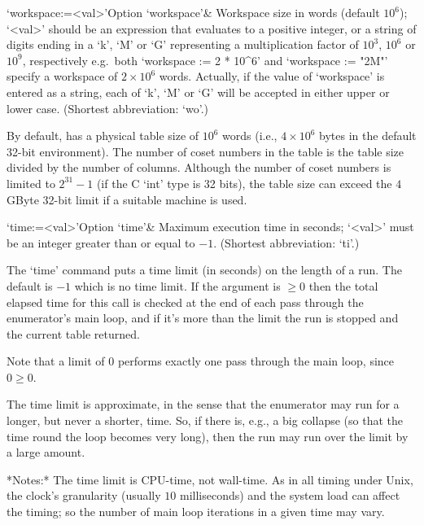 \beginitems

\>`workspace:=<val>'{Option `workspace'}&
Workspace size in words (default $10^6$);
`<val>' should be an expression that evaluates to a positive  integer,
or a string of digits ending in a  `k',  `M'  or  `G'  representing  a
multiplication  factor  of  $10^3$,  $10^6$  or  $10^9$,  respectively
e.g.~both `workspace := 2 * 10^6' and `workspace :=  "2M"'  specify  a
workspace  of  $2\times10^6$  words.  Actually,  if   the   value   of
`workspace' is entered as a string, each of `k', `M' or  `G'  will  be
accepted in either upper or lower case. (Shortest abbreviation: `wo'.)

By default, {\ACE} has a physical table size of $10^6$ words (i.e., $4
\times 10^6$ bytes in the  default 32-bit environment).  The number of
coset numbers in the table is  the table size divided by the number of
columns.   Although  the  number   of  coset  numbers  is  limited  to
$2^{31}-1$ (if the C `int' type is 32 bits), the table size can exceed
the $4$GByte 32-bit limit if a suitable machine is used.

\>`time:=<val>'{Option `time'}&
Maximum execution time in seconds; `<val>' must be an integer  greater
than or equal to $-1$. (Shortest abbreviation: `ti'.)

The `time' command  puts a time limit (in seconds) on  the length of a
run. The default is $-1$  which is no  time limit. If the  argument is
$\ge0$ then the total elapsed time for this call is checked at the end
of each pass through the enumerator's main loop, and if it's more than
the limit the run is stopped and the current table returned.

Note that a limit of $0$ performs exactly one pass  through  the  main
loop, since $0 \ge 0$.

%
%
%

The time  limit is approximate, in  the sense that  the enumerator may
run for a longer, but never a shorter, time.  So, if there is, e.g., a
big collapse (so that the time round the loop becomes very long), then
the run may run over the limit by a large amount.

*Notes:*
The time limit is CPU-time, not wall-time.  As  in  all  timing  under
Unix, the clock's granularity  (usually  $10$  milliseconds)  and  the
system load can  affect  the  timing;  so  the  number  of  main  loop
iterations in a given time may vary.

